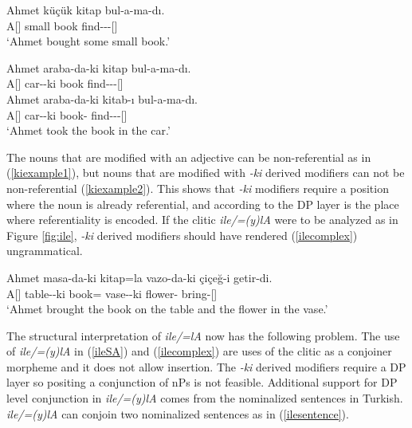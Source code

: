 \begin{exe}
\ex \label{kiexample}
    \begin{xlist}
    \ex \label{kiexample1}
    \gll Ahmet küçük kitap bul-a-ma-dı. \\
    A[{\Nom}] small book find-{\Abil}-{\Neg}-{\Pst}[{\Tsg}] \\ 
    \glt `Ahmet bought some small book.'

    \ex \label{kiexample2}
    \gll *Ahmet araba-da-ki kitap bul-a-ma-dı. \\ 
    A[{\Nom}] car-{\Loc}-ki book find-{\Abil}-{\Neg}-{\Pst}[{\Tsg}] \\
    
    \ex \label{kiexample3}
    \gll Ahmet araba-da-ki kitab-ı bul-a-ma-dı. \\ 
    A[{\Nom}] car-{\Loc}-ki book-{\Acc} find-{\Abil}-{\Neg}-{\Pst}[{\Tsg}] \\
\glt `Ahmet took the book in the car.'
\end{xlist}
\end{exe}

The nouns that are modified with an adjective can be non-referential as in (\ref{kiexample1}), but nouns that are modified with \textit{-ki} derived modifiers can not be non-referential (\ref{kiexample2}). This shows that \textit{-ki} modifiers require a position where the noun is already referential, and according to \citet{ozturk2002turkish} the DP layer is the place where referentiality is encoded. If the clitic \textit{ile/=(y)lA} were to be analyzed as in Figure \ref{fig:ile}, \textit{-ki} derived modifiers should have rendered (\ref{ilecomplex}) ungrammatical.

\begin{exe}
\ex \label{ilecomplex} 
\gll Ahmet masa-da-ki kitap=la vazo-da-ki çiçeğ-i getir-di. \\
A[{\Nom}] table-{\Loc}-ki book={\And} vase-{\Loc}-ki flower-{\Acc} bring-{\Pst}[{\Tsg}] \\
\glt`Ahmet brought the book on the table and the flower in the vase.'
\end{exe}

The structural interpretation of \textit{ile/=lA} now has the following problem. The use of \textit{ile/=(y)lA} in (\ref{ileSA}) and (\ref{ilecomplex}) are uses of the clitic as a conjoiner morpheme and it does not allow {\Case} insertion. The \textit{-ki} derived modifiers require a DP layer so positing a conjunction of nPs is not feasible. Additional support for DP level conjunction in \textit{ile/=(y)lA} comes from the nominalized sentences in Turkish. \textit{ile/=(y)lA} can conjoin two nominalized sentences as in (\ref{ilesentence}).

